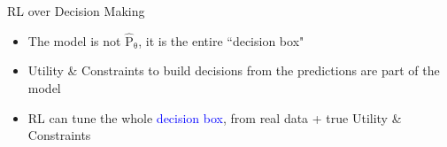 \documentclass[lecture]{beamer}
\newcommand{\vect}[1]{\ensuremath{\boldsymbol{\mathrm{#1}}}}
\begin{document}
\begin{frame}{\normalsize RL over Decision Making}
\vspace{-.25cm}
\begin{itemize}
\item The model is not $\hat{\mathrm P}_{\vect \theta}$, it is the entire ``decision box"
\item Utility \& Constraints to build decisions from the predictions are part of the model
\item RL can tune the whole \textcolor{blue}{decision box}, from real data + true Utility \& Constraints 
\end{itemize}




\end{frame}
\end{document}
